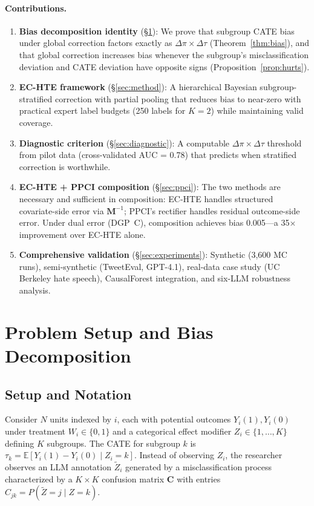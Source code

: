 \documentclass[11pt]{article}
\newcommand{\cate}{\tau}
\newcommand{\E}{\mathbb{E}}
\newcommand{\bM}{\mathbf{M}}
\newcommand{\bC}{\mathbf{C}}
\newcommand{\dpi}{\Delta\pi}
\newcommand{\dtau}{\Delta\tau}
\begin{document}
\paragraph{Contributions.}
\begin{enumerate}[leftmargin=*,nosep]
\item \textbf{Bias decomposition identity} (\S\ref{sec:theory}): We prove that subgroup CATE bias under global correction factors exactly as $\dpi \times \dtau$ (Theorem~\ref{thm:bias}), and that global correction increases bias whenever the subgroup's misclassification deviation and CATE deviation have opposite signs (Proposition~\ref{prop:hurts}).
\item \textbf{EC-HTE framework} (\S\ref{sec:method}): A hierarchical Bayesian subgroup-stratified correction with partial pooling that reduces bias to near-zero with practical expert label budgets (250 labels for $K{=}2$) while maintaining valid coverage.
\item \textbf{Diagnostic criterion} (\S\ref{sec:diagnostic}): A computable $\dpi \times \dtau$ threshold from pilot data (cross-validated AUC = 0.78) that predicts when stratified correction is worthwhile.
\item \textbf{EC-HTE + PPCI composition} (\S\ref{sec:ppci}): The two methods are necessary and sufficient in composition: EC-HTE handles structured covariate-side error via $\bM^{-1}$; PPCI's rectifier handles residual outcome-side error. Under dual error (DGP~C), composition achieves bias 0.005---a 35$\times$ improvement over EC-HTE alone.
\item \textbf{Comprehensive validation} (\S\ref{sec:experiments}): Synthetic (3,600 MC runs), semi-synthetic (TweetEval, GPT-4.1), real-data case study (UC Berkeley hate speech), CausalForest integration, and six-LLM robustness analysis.
\end{enumerate}

\section{Problem Setup and Bias Decomposition}
\label{sec:theory}

\subsection{Setup and Notation}

Consider $N$ units indexed by $i$, each with potential outcomes $Y_i(1), Y_i(0)$ under treatment $W_i \in \{0,1\}$ and a categorical effect modifier $Z_i \in \{1, \ldots, K\}$ defining $K$ subgroups.
The CATE for subgroup $k$ is $\cate_k = \E[Y_i(1) - Y_i(0) \mid Z_i = k]$.
Instead of observing $Z_i$, the researcher observes an LLM annotation $\tilde{Z}_i$ generated by a misclassification process characterized by a $K \times K$ confusion matrix $\bC$ with entries $C_{jk} = P(\tilde{Z} = j \mid Z = k)$.
\end{document}
